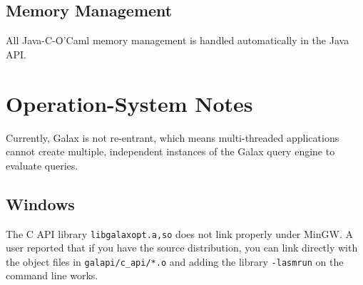 \subsection{Memory Management}

  All Java-C-O'Caml memory management is handled automatically in the
  Java API.

\section{Operation-System Notes}

  Currently, Galax is not re-entrant, which means multi-threaded
  applications cannot create multiple, independent instances of the
  Galax query engine to evaluate queries. 


\subsection{Windows}
\label{sec:api-notes-mingw}

The C API library \texttt{libgalaxopt.a,so} does not link properly
under MinGW.  A user reported that if you have the source
distribution, you can link directly with the object files in
\texttt{galapi/c\_api/*.o} and adding the library \texttt{-lasmrun} on
the command line works.

